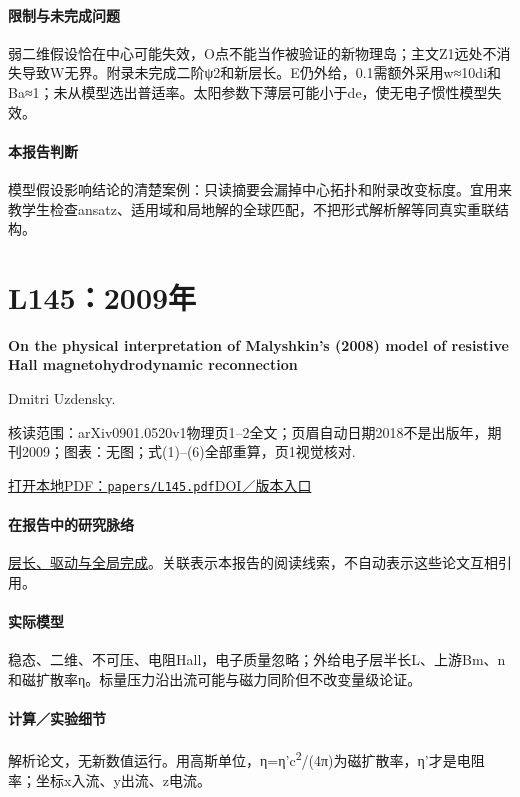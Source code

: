 \paragraph{限制与未完成问题}弱二维假设恰在中心可能失效，O点不能当作被验证的新物理岛；主文Z1远处不消失导致W无界。附录未完成二阶ψ2和新层长。E仍外给，0.1需额外采用w≈10di和Ba≈1；未从模型选出普适率。太阳参数下薄层可能小于de，使无电子惯性模型失效。

\paragraph{本报告判断}模型假设影响结论的清楚案例：只读摘要会漏掉中心拓扑和附录改变标度。宜用来教学生检查ansatz、适用域和局地解的全球匹配，不把形式解析解等同真实重联结构。

\section{L145：2009年}\label{paper:L145}

\textbf{On the physical interpretation of Malyshkin’s (2008) model of resistive Hall magnetohydrodynamic reconnection}\citep{L145}\

Dmitri Uzdensky.

\textsf{核读范围：}arXiv0901.0520v1物理页1–2全文；页眉自动日期2018不是出版年，期刊2009；\textsf{图表：}无图；式(1)–(6)全部重算，页1视觉核对.

\href{run:papers/L145.pdf}{打开本地PDF：\texttt{papers/L145.pdf}}\quad\href{https://doi.org/10.1063/1.3125819}{DOI／版本入口}

\paragraph{在报告中的研究脉络}\hyperref[story:global]{层长、驱动与全局完成}。关联表示本报告的阅读线索，不自动表示这些论文互相引用。

\paragraph{实际模型}稳态、二维、不可压、电阻Hall，电子质量忽略；外给电子层半长L、上游Bm、n和磁扩散率η。标量压力沿出流可能与磁力同阶但不改变量级论证。

\paragraph{计算／实验细节}解析论文，无新数值运行。用高斯单位，η=η'c\textsuperscript{2}/(4π)为磁扩散率，η'才是电阻率；坐标x入流、y出流、z电流。

